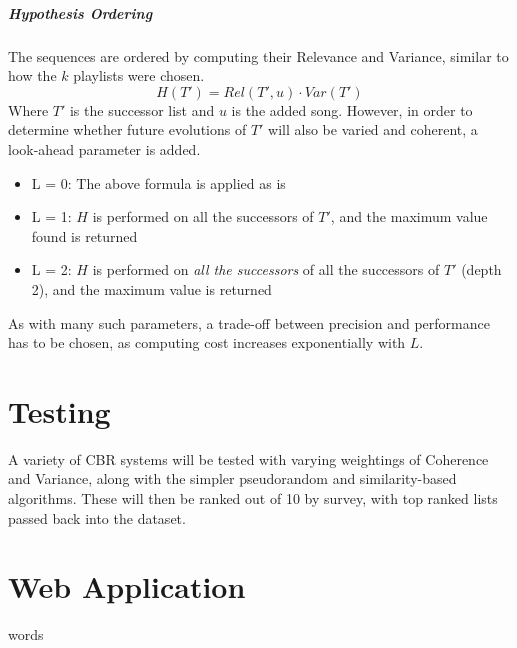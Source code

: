 \documentclass[a4paper, 12pt]{report}
\begin{document}
\paragraph{Hypothesis Ordering}
The sequences are ordered by computing their Relevance and Variance, similar to how the \(k\) playlists were chosen. 
\[H(T') = Rel(T', u) \cdot Var(T')\]
Where \(T'\) is the successor list and \(u\) is the added song. 
However, in order to determine whether future evolutions of \(T'\) will also be varied and coherent, a look-ahead parameter is added.
\begin{itemize}
    \item L = 0: The above formula is applied as is
    \item L = 1: \(H\) is performed on all the successors of \(T'\), and the maximum value found is returned 
    \item L = 2: \(H\) is performed on \emph{all the successors} of all the successors of \(T'\) (depth 2), and the maximum value is returned
\end{itemize}
As with many such parameters, a trade-off between precision and performance has to be chosen, as computing cost increases exponentially with \(L\).



\chapter{Testing}
A variety of CBR systems will be tested with varying weightings of Coherence and Variance, along with the simpler pseudorandom and similarity-based algorithms.
These will then be ranked out of 10 by survey, with top ranked lists passed back into the dataset.



\chapter{Web Application} \label{chap:webapp}
words


\printbibliography
\end{document}
